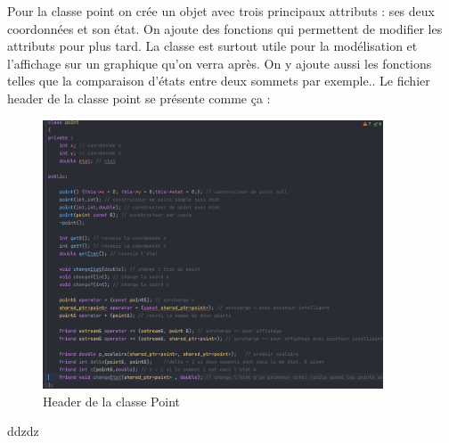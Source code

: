 \begin{article}
    Pour la classe point on crée un objet avec trois principaux attributs : ses deux coordonnées et son état.
    \newline On ajoute des fonctions qui permettent de modifier les attributs pour plus tard.
    La classe est surtout utile pour la modélisation et l'affichage sur un graphique qu'on verra après.
    \newline On y ajoute aussi les fonctions telles que la comparaison d'états entre deux sommets par exemple..
    Le fichier header de la classe point se présente comme ça :
    \newpage
    \begin{figure}[t]
        \centering
        \includegraphics[width=0.9\textwidth, inner]{./img/prog/point/fichier_header_point}
        \caption{Header de la classe Point}
        \label{fig:prog2}
    \end{figure}
    ddzdz
\end{article}